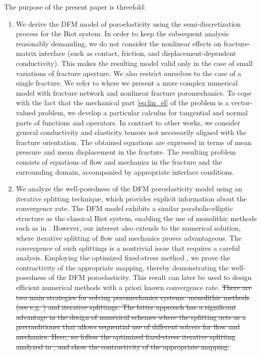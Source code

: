 \documentclass[a4paper]{article}
\numberwithin{equation}{section}
\def\js#1{{\color{blue}#1}}
\begin{document}
The purpose of the present paper is threefold:
\begin{enumerate}
    \item 
    \js{We derive the DFM model of poroelasticity using the semi-discretization process for the Biot system. In order to keep the subsequent analysis reasonably demanding, we do not consider the nonlinear effects on fracture-matrix interface (such as contact, friction, and displacement-dependent conductivity). This makes the resulting model valid only in the case of small variations of fracture aperture. We also restrict ourselves to the case of a single fracture. We refer to \cite{stebel_ugn} where we present a more complex numerical model with fracture network and nonlinear fracture poromechanics.}
    To cope with the fact that the mechanical part \eqref{eq:lin_el} of the problem is a vector-valued problem, we develop a particular calculus for tangential and normal parts of functions and operators.
    In contrast to other works, we consider general conductivity and elasticity tensors not necessarily aligned with the fracture orientation.
    The obtained equations are expressed in terms of mean pressure and mean displacement in the fracture.
    The resulting problem consists of equations of flow and mechanics in the fracture and the surrounding domain, accompanied by appropriate interface conditions.

    \item \js{We analyze the well-posedness of the DFM poroelasticity model using an iterative splitting technique, which provides explicit information about the convergence rate.
    The DFM model exhibits a similar parabolic-elliptic structure as the classical Biot system, enabling the use of monolithic methods such as in \cite{showalter2000diffusion,zenisek1984existence}. 
    However, our interest also extends to the numerical solution, where iterative splitting of flow and mechanics proves advantageous. 
    The convergence of such splittings is a nontrivial issue that requires a careful analysis. Employing the optimized fixed-stress method \cite{mikelic2013convergence}, we prove the contractivity of the appropriate mapping, thereby demonstrating the well-posedness of the DFM poroelasticity. This result can later be used to design efficient numerical methods with a priori known convergence rate.}
    \js{\sout{There are two main strategies for solving poromechanics systems: monolithic methods (see e.g.
    ) and iterative splittings.
    The latter approach has a significant advantage in the design of numerical schemes where the splitting acts as a preconditioner
    that allows sequential use of different solvers for flow and mechanics.
    Here, we follow the optimized fixed-stress iterative splitting analyzed in
    , and show the contractivity of the appropriate mapping\js.%
    }}


\end{enumerate}
\end{document}
